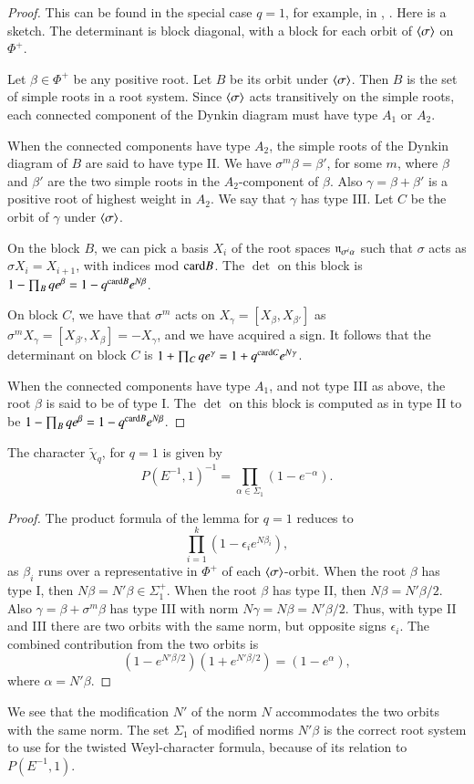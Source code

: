 \begin{proof} This can be found in the special case $q=1$, 
for example, in \cite{jantzen1977darstellungen}, \cite{wendt2001weyl}.  Here is a sketch.
The determinant is block diagonal, with a block for each orbit of $\langle{\sigma}\rangle$ on $\Phi^+$.

Let $\beta\in \Phi^+$ be any positive root.  Let $B$ be its orbit under $\langle{\sigma}\rangle$.
Then $B$ is the set of simple roots in a root system.   Since $\langle{\sigma}\rangle$ acts transitively on the simple roots,
each connected component of the Dynkin diagram must have type $A_1$ or $A_2$.  

When the connected components have type $A_2$, the simple roots of the Dynkin diagram of $B$ are said to have type II.
We have $\sigma^m \beta = \beta'$, for some $m$, where $\beta$ and $\beta'$ are the two simple roots in the $A_2$-component of $\beta$.
Also $\gamma = \beta + \beta'$ is a positive root of highest weight in $A_2$.  We say that $\gamma$ has type III.
Let $C$ be the orbit of $\gamma$ under $\langle{\sigma}\rangle$.  

On the block $B$, we can pick a basis $X_i$ of the
root spaces ${\mathfrak n}_{\sigma^i\alpha}$ such that $\sigma$ acts as $\sigma X_i = X_{i+1}$, with indices mod ${\operatorname{card}}{B}$.
The $\det$ on this block is $1- \prod_B {q e^{\beta}} = 1- q^{{\operatorname{card}} B} e^{N \beta}$.

On block $C$, we have that $\sigma^m$ acts on $X_\gamma = [X_\beta,X_{\beta'}]$ 
as $\sigma^m X_\gamma = [X_{\beta'},X_\beta] = -X_\gamma$, and we have acquired a sign.  
It follows that the determinant on block $C$
is $1+\prod_C {q e^\gamma} = 1+q^{{\operatorname{card}} C} e^{N\gamma}$.

When the connected
components have type $A_1$, and not type III as above, the root $\beta$ is said to be of type I.  
The $\det$ on this block is computed as in  type II to be $1- \prod_B q e^{\beta} = 1- q^{{\operatorname{card}}{B}} e^{N \beta}$.
\end{proof}

\begin{corollary} The character $\tilde \chi_q$, for $q=1$ is given by
\[
P(E^{-1},1)^{-1} = \prod_{\alpha\in\Sigma_1} (1-e^{-\alpha}).
\]
\end{corollary}

\begin{proof}  The product formula of the lemma for $q=1$ reduces to
\[
\prod_{i=1}^k (1 - \epsilon_i e^{N\beta_i}),
\]
as $\beta_i$ runs over a representative in $\Phi^+$ of each $\langle{\sigma}\rangle$-orbit.
When the root $\beta$ has type I, then $N\beta = N'\beta \in \Sigma^+_1$.
When the root $\beta$ has type II, then $N\beta = N'\beta/2$.
Also $\gamma = \beta+\sigma^m\beta$ has type III with norm $N\gamma = N\beta = N'\beta/2$.
Thus, with type II and III there are two orbits with the same norm, but opposite signs $\epsilon_i$.  
The combined contribution from the
two orbits is
\[
(1- e^{N'\beta/2})(1+e^{N'\beta/2}) = (1-e^\alpha),
\]
where $\alpha = N'\beta$.
\end{proof}
We see that the modification $N'$ of the norm $N$  accommodates the
two orbits with the same norm.  The set $\Sigma_1$ of modified norms $N'\beta$ is the
correct root system to use for the twisted Weyl-character formula, because of its relation to $P(E^{-1},1)$.


